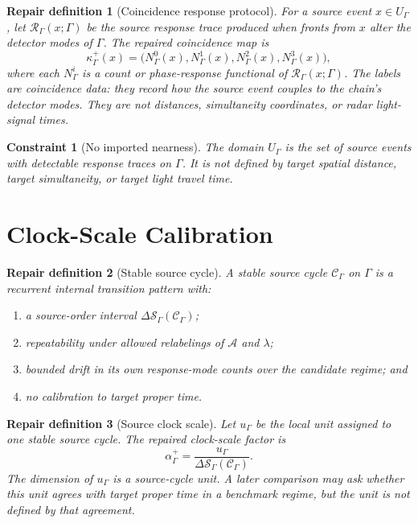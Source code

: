 \documentclass[11pt]{article}
\newcommand{\Sub}{\mathcal{A}}
\newcommand{\Order}{\mathcal{S}}
\newcommand{\Resp}{\mathcal{R}_{\Gamma}}
\newcommand{\Cycle}{\mathcal{C}_{\Gamma}}
\newtheorem{repairdefinition}{Repair definition}
\newtheorem{constraint}{Constraint}
\begin{document}
\begin{repairdefinition}[Coincidence response protocol]
For a source event \(x\in U_{\Gamma}\), let
\(\Resp(x;\Gamma)\) be the source response trace produced when fronts from
\(x\) alter the detector modes of \(\Gamma\). The repaired coincidence map is
\[
\kappa^{+}_{\Gamma}(x)
=
\bigl(
N^0_{\Gamma}(x),
N^1_{\Gamma}(x),
N^2_{\Gamma}(x),
N^3_{\Gamma}(x)
\bigr),
\]
where each \(N^i_{\Gamma}\) is a count or phase-response functional of
\(\Resp(x;\Gamma)\). The labels are coincidence data: they record how the
source event couples to the chain's detector modes. They are not distances,
simultaneity coordinates, or radar light-signal times.
\end{repairdefinition}

\begin{constraint}[No imported nearness]
The domain \(U_{\Gamma}\) is the set of source events with detectable response
traces on \(\Gamma\). It is not defined by target spatial distance, target
simultaneity, or target light travel time.
\end{constraint}

\section{Clock-Scale Calibration}

\begin{repairdefinition}[Stable source cycle]
A stable source cycle \(\Cycle\) on \(\Gamma\) is a recurrent internal
transition pattern with:
\begin{enumerate}
    \item a source-order interval \(\Delta\Order_{\Gamma}(\Cycle)\);
    \item repeatability under allowed relabelings of \(\Sub\) and \(\lambda\);
    \item bounded drift in its own response-mode counts over the candidate
    regime; and
    \item no calibration to target proper time.
\end{enumerate}
\end{repairdefinition}

\begin{repairdefinition}[Source clock scale]
Let \(u_{\Gamma}\) be the local unit assigned to one stable source cycle. The
repaired clock-scale factor is
\[
\alpha^{+}_{\Gamma}
=
\frac{u_{\Gamma}}{\Delta\Order_{\Gamma}(\Cycle)}.
\]
The dimension of \(u_{\Gamma}\) is a source-cycle unit. A later comparison may
ask whether this unit agrees with target proper time in a benchmark regime,
but the unit is not defined by that agreement.
\end{repairdefinition}
\end{document}
